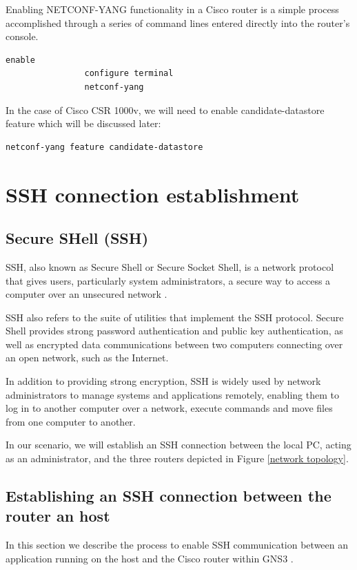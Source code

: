 Enabling NETCONF-YANG functionality in a Cisco router is a simple process accomplished through a series of command lines entered directly into the router's console.

\begin{lstlisting}[style=cliStyle,  backgroundcolor=\color{codebackground}]
                enable 
                configure terminal
                netconf-yang
\end{lstlisting}

In the case of Cisco CSR 1000v, we will need to enable candidate-datastore feature which will be discussed later:


\begin{lstlisting}[style=cliStyle,  backgroundcolor=\color{codebackground}]
                netconf-yang feature candidate-datastore
\end{lstlisting}

\section{SSH connection establishment}
\subsection{Secure SHell (SSH)}
SSH, also known as Secure Shell or Secure Socket Shell, is a network protocol that gives users, particularly system administrators, a secure way to access a computer over an unsecured network \cite{SSH}.

SSH also refers to the suite of utilities that implement the SSH protocol. Secure Shell provides strong password authentication and public key authentication, as well as encrypted data communications between two computers connecting over an open network, such as the Internet.

In addition to providing strong encryption, SSH is widely used by network administrators to manage systems and applications remotely, enabling them to log in to another computer over a network, execute commands and move files from one computer to another.

In our scenario, we will establish an SSH connection between the local PC, acting as an administrator, and the three routers depicted in Figure \ref{network topology}.

\subsection{Establishing an SSH connection between the router an host}
In this section we describe the process to enable SSH communication between an application running on the host and the Cisco router within GNS3 \cite{SSH2}.

